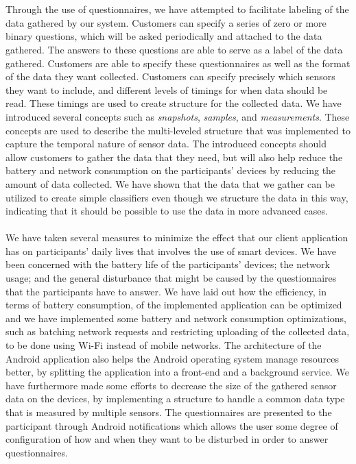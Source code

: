 \\\\
Through the use of questionnaires, we have attempted to facilitate labeling of the data gathered by our system. Customers can specify a series of zero or more binary questions, which will be asked periodically and attached to the data gathered. The answers to these questions are able to serve as a label of the data gathered. Customers are able to specify these questionnaires as well as the format of the data they want collected. Customers can specify precisely which sensors they want to include, and different levels of timings for when data should be read. These timings are used to create structure for the collected data. We have introduced several concepts such as \emph{snapshots}, \emph{samples}, and \emph{measurements}. These concepts are used to describe the multi-leveled structure that was implemented to capture the temporal nature of sensor data. The introduced concepts should allow customers to gather the data that they need, but will also help reduce the battery and network consumption on the participants' devices by reducing the amount of data collected. We have shown that the data that we gather can be utilized to create simple classifiers even though we structure the data in this way, indicating that it should be possible to use the data in more advanced cases.
\\\\
We have taken several measures to minimize the effect that our client application has on participants' daily lives that involves the use of smart devices. We have been concerned with the battery life of the participants' devices; the network usage; and the general disturbance that might be caused by the questionnaires that the participants have to answer. We have laid out how the efficiency, in terms of battery consumption, of the implemented application can be optimized and we have implemented some battery and network consumption optimizations, such as batching network requests and restricting uploading of the collected data, to be done using Wi-Fi instead of mobile networks. The architecture of the Android application also helps the Android operating system manage resources better, by splitting the application into a front-end and a background service. We have furthermore made some efforts to decrease the size of the gathered sensor data on the devices, by implementing a structure to handle a common data type that is measured by multiple sensors. The questionnaires are presented to the participant through Android notifications which allows the user some degree of configuration of how and when they want to be disturbed in order to answer questionnaires. %
